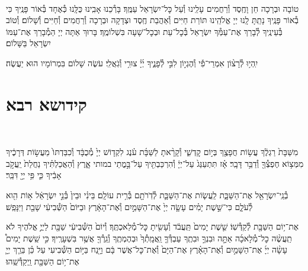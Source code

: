 \documentclass[twoside, openany, parskip=half, 11pt]{book}
\begin{document}
\shatz\\
טוֹבָה וּבְרָכָה חֵן וָחֶֽסֶד וְ֯רַחֲמִים עָלֵֽינוּ וְ֯עַל כׇּל־יִשְׂרָאֵל עַמֶּֽךָ׃ בָּרְ֯כֵנוּ אָבִֽינוּ כֻּלָּֽנוּ כְּ֯אֶחָד בְּ֯אוֹר פָּנֶֽיךָ כִּי בְ֯אוֹר פָּנֶֽיךָ נָתַֽתָּ לָֽנוּ יְיָ אֱלֹהֵֽינוּ תּוֹרַת חַיִּים וְ֯אַהֲבַת חֶֽסֶד וּצְדָקָה וּבְרָכָה וְ֯רַחֲמִים וְ֯חַיִּים וְ֯שָׁלוֹם׃ וְ֯טוֹב בְּ֯עֵינֶֽיךָ לְ֯בָרֵךְ אֶת־עַמְּ֯ךָ יִשְׂרָאֵל בְּ֯כׇל־עֵת וּבְכׇל־שָׁעָה בִּשְׁלוֹמֶֽךָ׃ בָּרוּךְ אַתָּה יְיָ הַמְ֯בָרֵךְ אֶת־עַמּוֹ יִשְׂרָאֵל בַּשָּׁלוֹם׃

יִֽהְי֥וּ לְ֯רָצ֨וֹן אִמְרֵי־פִ֡י וְ֯הֶגְי֣וֹן לִבִּ֣י לְ֯פָנֶ֑יךָ יְ֜יָ֗ צוּרִ֥י וְ֯גֹֽאֲלִֽי׃ עֹשֶׂה שָׁלוֹם בִּמְרוֹמָיו הוּא יַעֲשֶׂה׃

\vfill



\nextpage

\siyyumshabbatYT

\mournerskaddish

\adonolam

\chapter[קידושא רבא ליו״ט]{ קידושא רבא }
\\
\begin{sometimes}

מִשַּׁבָּת֙ רַגְלֶ֔ךָ עֲשׂ֥וֹת חֲפָצֶ֖ךָ בְּי֣וֹם קׇדְשִׁ֑י וְ֯קָרָ֨אתָ לַשַּׁבָּ֜ת עֹ֗נֶג לִקְד֤וֹשׁ יְיָ֙ מְ֯כֻבָּ֔ד וְ֯כִבַּדְתּוֹ֙ מֵעֲשׂ֣וֹת דְּרָכֶ֔יךָ מִמְּצ֥וֹא חֶפְצְ֯ךָ֖ וְ֯דַבֵּ֥ר דָּבָֽר׃ אָ֗ז תִּתְעַנַּג֙ עַל־יְיָ֔ וְ֯הִרְכַּבְתִּ֖יךָ עַל־בָּ֣מֳתֵי במותי אָ֑רֶץ וְ֯הַאֲכַלְתִּ֗יךָ נַחֲלַת֙ יַֽעֲקֹ֣ב אָבִ֔יךָ כִּ֛י פִּ֥י יְיָ֖ דִּבֵּֽר׃

בְ֯נֵֽי־יִשְׂרָאֵ֖ל אֶת־הַשַּׁבָּ֑ת לַֽעֲשׂ֧וֹת אֶת־הַשַּׁבָּ֛ת לְ֯דֹֽרֹתָ֖ם בְּ֯רִ֥ית עוֹלָֽם׃ בֵּינִ֗י וּבֵין֙ בְּ֯נֵ֣י יִשְׂרָאֵ֔ל א֥וֹת הִ֖וא לְ֯עֹלָ֑ם כִּי־שֵׁ֣שֶׁת יָמִ֗ים עָשָׂ֤ה יְיָ֙ אֶת־הַשָּׁמַ֣יִם וְ֯אֶת־הָאָ֔רֶץ וּבַיּוֹם֙ הַשְּׁ֯בִיעִ֔י שָׁבַ֖ת וַיִּנָּפַֽשׁ׃


אֶת־י֥וֹם הַשַּׁבָּ֖ת לְ֯קַדְּ֯שֽׁוֹ׃ שֵׁ֤שֶׁת יָמִים֙ תַּֽעֲבֹ֔ד וְ֯עָשִׂ֖יתָ כׇּל־מְ֯לַאכְתֶּֽךָ׃ וְ֯יוֹם֙ הַשְּׁ֯בִיעִ֔י שַׁבָּ֖ת לַיֽיֳ֣ אֱלֹהֶיךָ לֹא תַֽעֲשֶׂ֨ה כׇל־מְ֯לָאכָ֜ה אַתָּ֣ה וּבִנְךָ֣ וּבִתֶֽךָ עַבְדְּ֯ךָ֤ וַֽאֲמָֽתְ֯ךָ֙ וּבְהֶמְתֶֽךָ וְ֯גֵֽרְ֯ךָ֖ אֲשֶׁ֥ר בִּשְׁעָרֶֽיךָ׃ כִּ֣י שֵֽׁשֶׁת יָמִים֩ עָשָׂ֨ה יְיָ֜ אֶת־הַשָּׁמַ֣יִם וְ֯אֶת־הָאָ֗רֶץ אֶת־הַיָּם֙ וְ֯אֶת־כׇּל־אֲשֶׁר בָּ֔ם וַיָּ֖נַח בַּיּ֣וֹם הַשְּׁ֯בִיעִי עַל כֵּ֗ן בֵּרַ֧ךְ יְיָ֛ אֶת־י֥וֹם הַשַּׁבָּ֖ת וַֽיְקַדְּ֯שֵֽׁהוּ׃

\end{sometimes}
\end{document}
